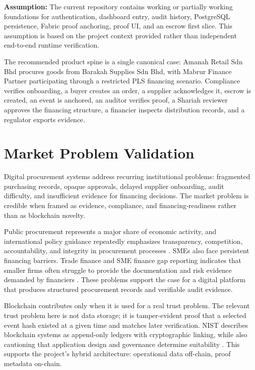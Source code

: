 \documentclass[conference]{IEEEtran}
\newcommand{\assumption}[1]{\textbf{Assumption:} #1}
\begin{document}
\assumption{The current repository contains working or partially working foundations for authentication, dashboard entry, audit history, PostgreSQL persistence, Fabric proof anchoring, proof UI, and an escrow first slice. This assumption is based on the project context provided rather than independent end-to-end runtime verification.}

The recommended product spine is a single canonical case: Amanah Retail Sdn Bhd procures goods from Barakah Supplies Sdn Bhd, with Mabrur Finance Partner participating through a restricted PLS financing scenario. Compliance verifies onboarding, a buyer creates an order, a supplier acknowledges it, escrow is created, an event is anchored, an auditor verifies proof, a Shariah reviewer approves the financing structure, a financier inspects distribution records, and a regulator exports evidence.

\section{Market Problem Validation}

Digital procurement systems address recurring institutional problems: fragmented purchasing records, opaque approvals, delayed supplier onboarding, audit difficulty, and insufficient evidence for financing decisions. The market problem is credible when framed as evidence, compliance, and financing-readiness rather than as blockchain novelty.

Public procurement represents a major share of economic activity, and international policy guidance repeatedly emphasizes transparency, competition, accountability, and integrity in procurement processes \cite{OECD2015Procurement}. SMEs also face persistent financing barriers. Trade finance and SME finance gap reporting indicates that smaller firms often struggle to provide the documentation and risk evidence demanded by financiers \cite{IFCSMEFinanceGap,ADBTradeFinanceGap}. These problems support the case for a digital platform that produces structured procurement records and verifiable audit evidence.

Blockchain contributes only when it is used for a real trust problem. The relevant trust problem here is not data storage; it is tamper-evident proof that a selected event hash existed at a given time and matches later verification. NIST describes blockchain systems as append-only ledgers with cryptographic linking, while also cautioning that application design and governance determine suitability \cite{NISTBlockchain}. This supports the project's hybrid architecture: operational data off-chain, proof metadata on-chain.
\end{document}
